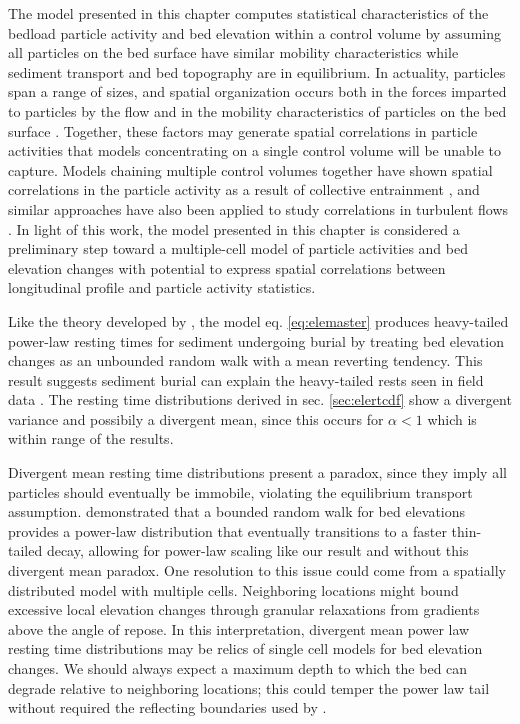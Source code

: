 The model presented in this chapter computes statistical characteristics of the bedload particle activity and bed elevation within a control volume by assuming all particles on the bed surface have similar mobility characteristics while sediment transport and bed topography are in equilibrium. In actuality, particles span a range of sizes, and spatial organization occurs both in the forces imparted to particles by the flow \citep{Shih2017,Amir2014} and in the mobility characteristics of particles on the bed surface \citep{Charru2004, Hassan2008, Nelson2014}.
Together, these factors may generate spatial correlations in particle activities that models concentrating on a single control volume will be unable to capture. 
Models chaining multiple control volumes together have shown spatial correlations in the particle activity as a result of collective entrainment \citep{Heyman2014, Ancey2015}, and similar approaches have also been applied to study correlations in turbulent flows \citep{Gardiner1983}. In light of this work, the model presented in this chapter is considered a preliminary step toward a multiple-cell model of particle activities and bed elevation changes with potential to express spatial correlations between longitudinal profile and particle activity statistics.

Like the theory developed by \citet{Martin2014}, the model eq. \ref{eq:elemaster} produces heavy-tailed power-law resting times for sediment undergoing burial by treating bed elevation changes as an unbounded random walk with a mean reverting tendency.
This result suggests sediment burial can explain the heavy-tailed rests seen in field data \citep{Olinde2015,Bradley2017,Pretzlav2016a}. 
The resting time distributions derived in sec. \ref{sec:elertcdf} show a divergent variance and possibily a divergent mean, since this occurs for $\alpha < 1$ \citep{Sornette2006} which is within range of the results.

Divergent mean resting time distributions present a paradox, since they imply all particles should eventually be immobile, violating the equilibrium transport assumption.
\citet{Voepel2013} demonstrated that a bounded random walk for bed elevations provides a power-law distribution that eventually transitions to a faster thin-tailed decay, allowing for power-law scaling like our result and \citet{Martin2014} without this divergent mean paradox. 
One resolution to this issue could come from a spatially distributed model with multiple cells.
Neighboring locations might bound excessive local elevation changes through granular relaxations from gradients above the angle of repose.
In this interpretation, divergent mean power law resting time distributions may be relics of single cell models for bed elevation changes.
We should always expect a maximum depth to which the bed can degrade relative to neighboring locations; this could temper the power law tail without required the reflecting boundaries used by \citet{Voepel2013}.

